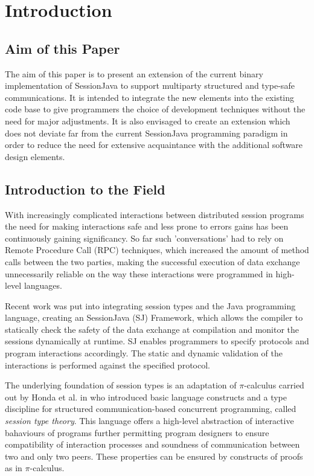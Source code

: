 \chapter{Introduction}
\label{sec:intro}

\section{Aim of this Paper}

The aim of this paper is to present an extension of the current binary implementation of SessionJava to support multiparty structured and type-safe communications. It is intended to integrate the new elements into the existing code base to give programmers the choice of development techniques without the need for major adjustments. It is also envisaged to create an extension which does not deviate far from the current SessionJava programming paradigm in order to reduce the need for extensive acquaintance with the additional software design elements.   

\section{Introduction to the Field}

With increasingly complicated interactions between distributed session programs the need for making interactions safe and less prone to errors gains has been continuously gaining significancy. So far such 'conversations' had to rely on Remote Procedure Call (RPC) techniques, which increased the amount of method calls between the two parties, making the successful execution of data exchange unnecessarily reliable on the way these interactions were programmed in high-level languages.

Recent work was put into integrating session types and the Java programming language, creating an SessionJava (SJ) Framework, which allows the compiler to statically check the safety of the data exchange at compilation and monitor the sessions dynamically at runtime\cite{sessionbased_programming}. SJ enables programmers to specify protocols and program interactions accordingly. The static and dynamic validation of the interactions is performed against the specified protocol.

The underlying foundation of session types is an adaptation of $\pi$-calculus carried out by Honda et al. in \cite{language_primitives} who introduced basic language constructs and a type discipline for structured communication-based concurrent programming, called \textit{session type theory}. This language offers a high-level abstraction of interactive bahaviours of programs further permitting program designers to ensure compatibility of interaction processes and soundness of communication between two and only two peers. These properties can be ensured by constructs of proofs as in $\pi$-calculus.

